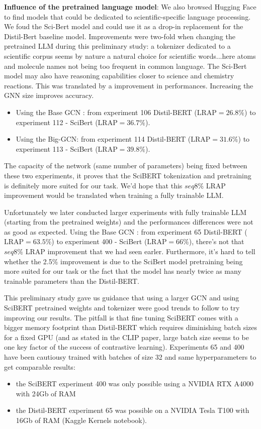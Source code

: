 \textbf{Influence of the pretrained language model}: We also browsed Hugging Face to find models that could be dedicated to scientific-specific language processing. We foud the Sci-Bert\cite{scibert} model and could use it as a drop-in replacement for the Distil-Bert baseline model. Improvements were two-fold when changing the pretrained LLM during this preliminary study: a tokenizer dedicated to a scientific corpus seems by nature a natural choice for scientific words...here atoms and molecule names not being too frequent in common language. The Sci-Bert model may also have reasoning capabilities closer to science and chemistry reactions. This was translated by a improvement in performances. Increasing the GNN size improves accuracy.
\begin{itemize}
    \item Using the Base GCN : from experiment 106 Distil-BERT ($\text{LRAP}=26.8\%$) to experiment 112 - SciBert ($\text{LRAP}=36.7\%$).
    \item Using the Big-GCN: from experiment 114 Distil-BERT ($\text{LRAP}=31.6\%$) to experiment 113 - SciBert ($\text{LRAP}=39.8\%$).
\end{itemize}
The capacity of the network (same number of parameters) being fixed between these two experiments, it proves that the SciBERT tokenization and pretraining is definitely more suited for our task. We'd hope that this $seq 8\%$ LRAP improvement would be translated when training a fully trainable LLM.

Unfortunately we later conducted larger experiments with fully trainable LLM (starting from the pretrained weights) and the performances differences were not as good as expected. Using the Base GCN : from experiment 65 Distil-BERT ($\text{LRAP}=63.5\%$) to experiment 400 - SciBert ($\text{LRAP}=66\%$), there's not that $seq 8\%$ LRAP improvement that we had seen earler. Furthermore, it's hard to tell whether the 2.5\% improvement is due to the SciBert model pretraining being more suited for our task or the fact that the model has nearly twice as many trainable parameters than the Distil-BERT. 

This preliminary study gave us guidance that using a larger GCN and using SciBERT pretrained weights and tokenizer were good trends to follow to try improving our results. The pitfall is that fine tuning SciBERT comes with a bigger memory footprint than Distil-BERT which requires diminishing batch sizes for a fixed GPU (and as stated in the CLIP paper, large batch size seems to be one key factor of the success of contrastive learning). Experiments 65 and 400 have been cautiousy trained with batches of size 32 and same hyperparameters to get comparable results: 
\begin{itemize}
    \item the SciBERT experiment 400 was only possible using a NVIDIA RTX A4000 with 24Gb of RAM \item the Distil-BERT experiment 65 was possible on a NVIDIA Tesla T100 with 16Gb of RAM (Kaggle Kernels notebook).
\end{itemize}



